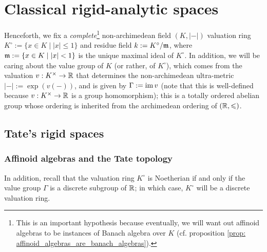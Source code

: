 \section{Classical rigid-analytic spaces}
    \begin{convention} \label{conv: rigid_analytic_varieties_non_archimedean_ground_field}
        Henceforth, we fix a \textit{complete}\footnote{This is an important hypothesis because eventually, we will want out affinoid algebras to be instances of Banach algebra over $K$ (cf. proposition \ref{prop: affinoid_algebras_are_banach_algebras}).} non-archimedean field $(K, |-|)$ valuation ring $K^{\circ} := \{x \in K \mid |x| \leq 1\}$ and residue field $k := K^{\circ}/\mathfrak{m}$, where $\mathfrak{m} := \{x \in K \mid |x| < 1\}$ is the unique maximal ideal of $K^{\circ}$. In addition, we will be caring about the value group of $K$ (or rather, of $K^{\circ}$), which comes from the valuation $v: K^{\x} \to \R$ that determines the non-archimedean ultra-metric $|-| := \exp(v(-))$, and is given by $\Gamma := \operatorname{im} v$ (note that this is well-defined because $v: K^{\x} \to \R$ is a group homomorphism); this is a totally ordered abelian group whose ordering is inherited from the archimedean ordering of $(\mathbb{R}, \leqslant)$.
    \end{convention}

    \subsection{Tate's rigid spaces}
        \subsubsection{Affinoid algebras and the Tate topology}
            \begin{remark}
                In addition, recall that the valuation ring $K^{\circ}$ is Noetherian if and only if the value group $\Gamma$ is a discrete subgroup of $\mathbb{R}$; in which case, $K^{\circ}$ will be a discrete valuation ring.
            \end{remark}
            
